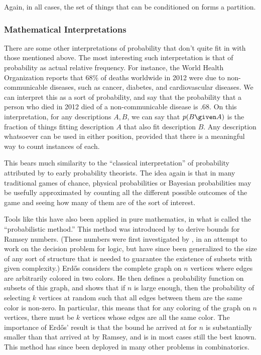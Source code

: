 Again, in all cases, the set of things that can be conditioned on forms a partition.

\subsubsection{Mathematical Interpretations}

There are some other interpretations of probability that don't quite fit in with those mentioned above. The most interesting such interpretation is that of probability as actual relative frequency. For instance, the World Health Organization reports that $68\%$ of deaths worldwide in 2012 were due to non-communicable diseases, such as cancer, diabetes, and cardiovascular diseases. We can interpret this as a sort of probability, and say that the probability that a person who died in 2012 died of a non-communicable disease is $.68$. On this interpretation, for any descriptions $A,B$, we can say that $p(B \given A)$ is the fraction of things fitting description $A$ that also fit description $B$. Any description whatsoever can be used in either position, provided that there is a meaningful way to count instances of each.

This bears much similarity to the ``classical interpretation'' of probability attributed by \citet{interp} to early probability theorists. The idea again is that in many traditional games of chance, physical probabilities or Bayesian probabilities may be usefully approximated by counting all the different possible outcomes of the game and seeing how many of them are of the sort of interest.

Tools like this have also been applied in pure mathematics, in what is called the ``probabilistic method.'' This method was introduced by \citet{erdos} to derive bounds for Ramsey numbers. (These numbers were first investigated by \citealp{ramseytheory}, in an attempt to work on the decision problem for logic, but have since been generalized to the size of any sort of structure that is needed to guarantee the existence of subsets with given complexity.) Erd\H{o}s considers the complete graph on $n$ vertices where edges are arbitrarily colored in two colors. He then defines a probability function on subsets of this graph, and shows that if $n$ is large enough, then the probability of selecting $k$ vertices at random such that all edges between them are the same color is non-zero. In particular, this means that for any coloring of the graph on $n$ vertices, there must be $k$ vertices whose edges are all the same color. The importance of Erd\H{o}s' result is that the bound he arrived at for $n$ is substantially smaller than that arrived at by Ramsey, and is in most cases still the best known. This method has since been deployed in many other problems in combinatorics.

